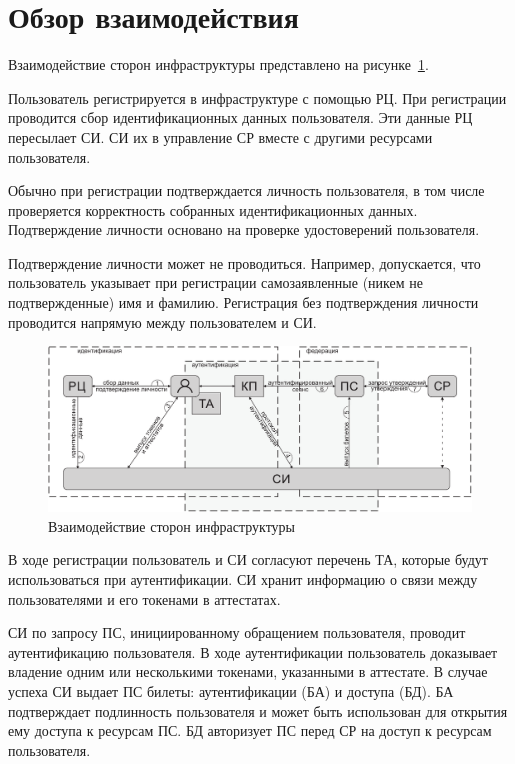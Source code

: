 \section{Обзор взаимодействия}\label{COMMON.Overview}

Взаимодействие сторон инфраструктуры представлено на 
рисунке~\ref{Fig.COMMON.Bias}.

Пользователь регистрируется в инфраструктуре с помощью РЦ. При регистрации
проводится сбор идентификационных данных пользователя. Эти данные РЦ пересылает 
СИ. СИ  их в управление СР вместе с другими ресурсами 
пользователя.

Обычно при регистрации подтверждается личность пользователя, в том числе 
проверяется корректность собранных идентификационных данных. Подтверждение 
личности основано на проверке удостоверений пользователя.

Подтверждение личности может не проводиться. Например, допускается, что пользователь
указывает при регистрации самозаявленные (никем не подтвержденные) имя и
фамилию. Регистрация без подтверждения личности проводится напрямую между
пользователем и СИ.

\begin{figure}[hbt]
\begin{center}
\includegraphics[width=17cm]{../figs/bias}
\end{center}
\caption{Взаимодействие сторон инфраструктуры}
\label{Fig.COMMON.Bias}
\end{figure}


В ходе регистрации пользователь и СИ согласуют перечень ТА, которые будут 
использоваться при аутентификации. СИ хранит информацию о связи между 
пользователями и его токенами в аттестатах.

СИ по запросу ПС, инициированному обращением пользователя, проводит
аутентификацию пользователя. В ходе аутентификации пользователь доказывает
владение одним или несколькими токенами, указанными в аттестате.
%
В случае успеха СИ выдает ПС билеты: аутентификации (БА) и доступа (БД). 
%
БА подтверждает подлинность пользователя и может быть использован
для открытия ему доступа к ресурсам ПС.
%
БД авторизует ПС перед СР на доступ к ресурсам пользователя.

